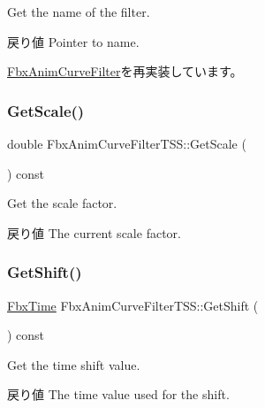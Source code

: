 Get the name of the filter. \begin{DoxyReturn}{戻り値}
Pointer to name. 
\end{DoxyReturn}


\hyperlink{class_fbx_anim_curve_filter_abd559d5052fbb072042e59241940a35c}{Fbx\+Anim\+Curve\+Filter}を再実装しています。

\mbox{\label{class_fbx_anim_curve_filter_t_s_s_a0b5ee5c02fdbc4cd8cfadaa5f761280d}} 
\subsubsection{\texorpdfstring{Get\+Scale()}{GetScale()}}
{\footnotesize\ttfamily double Fbx\+Anim\+Curve\+Filter\+T\+S\+S\+::\+Get\+Scale (\begin{DoxyParamCaption}{ }\end{DoxyParamCaption}) const}

Get the scale factor. \begin{DoxyReturn}{戻り値}
The current scale factor. 
\end{DoxyReturn}
\mbox{\label{class_fbx_anim_curve_filter_t_s_s_aee0e42f4c5e802418408d0c0640f9b98}} 
\subsubsection{\texorpdfstring{Get\+Shift()}{GetShift()}}
{\footnotesize\ttfamily \hyperlink{class_fbx_time}{Fbx\+Time} Fbx\+Anim\+Curve\+Filter\+T\+S\+S\+::\+Get\+Shift (\begin{DoxyParamCaption}{ }\end{DoxyParamCaption}) const}

Get the time shift value. \begin{DoxyReturn}{戻り値}
The time value used for the shift. 
\end{DoxyReturn}
\mbox{\label{class_fbx_anim_curve_filter_t_s_s_aebf5798bd833f7dced2a11aea61b1c35}} 
